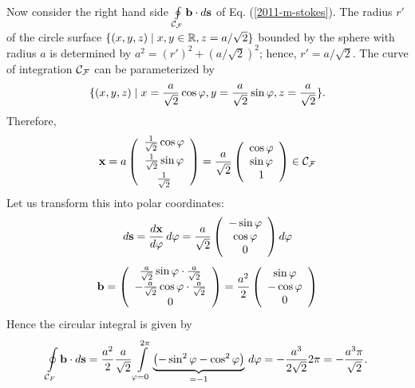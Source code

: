 {\begin{enumerate}
Now consider the right hand side $\oint \limits_{{\cal C}_{\cal F}} {\bf b} \cdot d{\bf s}$
of Eq. (\ref{2011-m-stokes}).
The radius $r'$ of the circle  surface
$\{(x,y,z) \mid x,y \in {\Bbb R} ,z=a/\sqrt{2}\}$ bounded by the sphere with radius $a$
is determined by
$ a^2 =(r')^2 +(a/ \sqrt{2})^2$; hence, $r' =a/\sqrt{2}$.
The curve of integration ${\cal C}_{\cal F}$ can be parameterized by
$$\{(x,y,z) \mid
x={a\over \sqrt{2}} \cos \varphi,
y={a\over \sqrt{2}} \sin \varphi,
z={a\over \sqrt{2}}\}.$$
Therefore,
$$
  {\bf x} = a
  \left(
    \begin{array}{c}
      \frac{1}{\sqrt2}\cos\varphi \\[1ex]
      \frac{1}{\sqrt2}\sin\varphi \\[1ex]
      \frac{1}{\sqrt2}
    \end{array}
  \right)=
  \frac{a}{\sqrt{2}}
  \left(
    \begin{array}{c}
      \cos\varphi \\
      \sin\varphi \\
      1
    \end{array}
  \right)
\in {\cal C}_{\cal F}
$$
Let us transform this into polar coordinates:
$$
  d{\bf s}=\frac{d{\bf x}}{d\varphi} \,d\varphi =
  \frac{a}{\sqrt{2}}
  \left(
    \begin{array}{c}
      -\sin\varphi \\
      \cos\varphi \\
      0
    \end{array}
  \right) d\varphi
$$
$$
  {\bf b}=
  \left(
    \begin{array}{c}
      \frac{a}{\sqrt{2}}\sin\varphi\cdot\frac{a}{\sqrt{2}} \\
      -\frac{a}{\sqrt{2}}\cos\varphi\cdot\frac{a}{\sqrt{2}} \\
      0
    \end{array}
  \right)=
  \frac{a^2}{2}
  \left(
    \begin{array}{c}
      \sin\varphi \\
      -\cos\varphi \\
      0
    \end{array}
  \right)
$$
Hence the circular integral is given by
$$
  \oint \limits_{{\cal C}_F} {\bf b} \cdot d{\bf s}=
  \frac{a^2}{2}\frac{a}{\sqrt{2}}
  \int \limits_{\varphi=0}^{2 \pi}
  \underbrace
    {\left(-\sin^2\varphi-\cos^2\varphi\right)}
  _{=-1}
  \, d\varphi =
  -\frac{a^3}{2\sqrt{2}}2 \pi=-\frac{a^3 \pi}{\sqrt{2}}
.
$$



\end{enumerate}}
